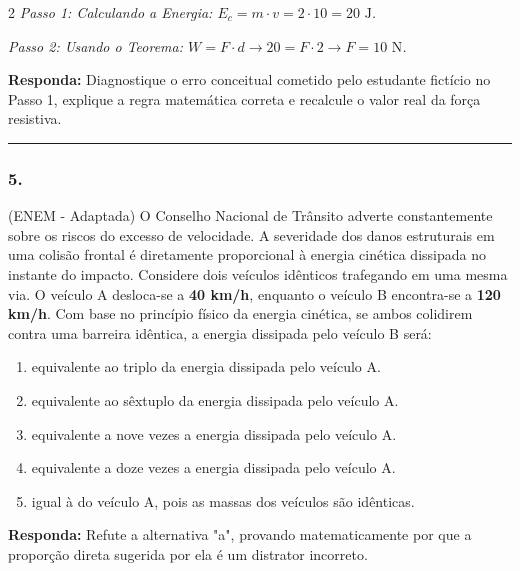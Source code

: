 \documentclass[twoside, 10pt, a4paper]{article}
\newlength{\espacoPreQuestao}\setlength{\espacoPreQuestao}{0.1cm}
\newlength{\espacoQuestao}\setlength{\espacoQuestao}{0.2cm}
\newlength{\espacoAlt}\setlength{\espacoAlt}{0.2cm}
\begin{document}
\begin{multicols*}{2}
\textit{Passo 1: Calculando a Energia: $E_c = m \cdot v = 2 \cdot 10 = 20 \text{ J}$.}

\textit{Passo 2: Usando o Teorema: $W = F \cdot d \rightarrow 20 = F \cdot 2 \rightarrow F = 10 \text{ N}$.}
\begin{boxresponda}
\textbf{Responda:} Diagnostique o erro conceitual cometido pelo estudante fictício no Passo 1, explique a regra matemática correta e recalcule o valor real da força resistiva.
\end{boxresponda}
\par\vspace{\espacoQuestao}

\noindent\textcolor{CorLinha}{\rule{\linewidth}{0.5pt}} 
\par\vspace{\espacoPreQuestao}
\subsubsection*{5.} (ENEM - Adaptada) O Conselho Nacional de Trânsito adverte constantemente sobre os riscos do excesso de velocidade. A severidade dos danos estruturais em uma colisão frontal é diretamente proporcional à energia cinética dissipada no instante do impacto. Considere dois veículos idênticos trafegando em uma mesma via. O veículo A desloca-se a \textbf{40 km/h}, enquanto o veículo B encontra-se a \textbf{120 km/h}. Com base no princípio físico da energia cinética, se ambos colidirem contra uma barreira idêntica, a energia dissipada pelo veículo B será:
\begin{enumerate}[label=\alph*), itemsep=\espacoAlt]
    \item equivalente ao triplo da energia dissipada pelo veículo A.
    \item equivalente ao sêxtuplo da energia dissipada pelo veículo A.
    \item equivalente a nove vezes a energia dissipada pelo veículo A.
    \item equivalente a doze vezes a energia dissipada pelo veículo A.
    \item igual à do veículo A, pois as massas dos veículos são idênticas.
\end{enumerate}
\begin{boxresponda}
\textbf{Responda:} Refute a alternativa "a", provando matematicamente por que a proporção direta sugerida por ela é um distrator incorreto.
\end{boxresponda}
\par\vspace{\espacoQuestao}


\end{multicols*}
\end{document}
